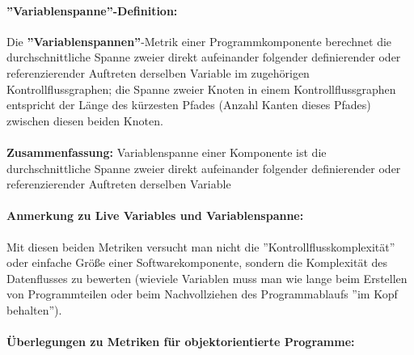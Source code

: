 \paragraph{''Variablenspanne''-Definition:}

Die \textbf{''Variablenspannen''}-Metrik einer Programmkomponente berechnet die durchschnittliche Spanne zweier direkt aufeinander folgender definierender oder referenzierender Auftreten derselben Variable im zugehörigen Kontrollflussgraphen; die Spanne zweier Knoten in einem Kontrollflussgraphen entspricht der Länge des kürzesten Pfades (Anzahl Kanten dieses Pfades) zwischen diesen beiden Knoten.
\\
\\
\textbf{Zusammenfassung:} Variablenspanne einer Komponente ist die durchschnittliche Spanne zweier direkt aufeinander folgender definierender oder referenzierender Auftreten derselben Variable

\paragraph{Anmerkung zu Live Variables und Variablenspanne:}

Mit diesen beiden Metriken versucht man nicht die ''Kontrollflusskomplexität'' oder einfache Größe einer Softwarekomponente, sondern die Komplexität des Datenflusses zu bewerten (wieviele Variablen muss man wie lange beim Erstellen von Programmteilen oder beim Nachvollziehen des Programmablaufs ''im Kopf behalten'').

\paragraph{Überlegungen zu Metriken für objektorientierte Programme:}

